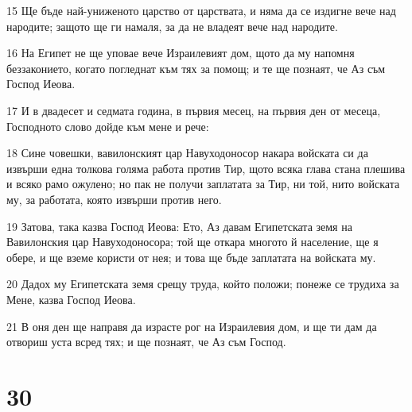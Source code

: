 \par 15 Ще бъде най-униженото царство от царствата, и няма да се издигне вече над народите; защото ще ги намаля, за да не владеят вече над народите.
\par 16 На Египет не ще уповае вече Израилевият дом, щото да му напомня беззаконието, когато погледнат към тях за помощ; и те ще познаят, че Аз съм Господ Иеова.
\par 17 И в двадесет и седмата година, в първия месец, на първия ден от месеца, Господното слово дойде към мене и рече:
\par 18 Сине човешки, вавилонският цар Навуходоносор накара войската си да извърши една толкова голяма работа против Тир, щото всяка глава стана плешива и всяко рамо ожулено; но пак не получи заплатата за Тир, ни той, нито войската му, за работата, която извърши против него.
\par 19 Затова, така казва Господ Иеова: Ето, Аз давам Египетската земя на Вавилонския цар Навуходоносора; той ще откара многото й население, ще я обере, и ще вземе користи от нея; и това ще бъде заплатата на войската му.
\par 20 Дадох му Египетската земя срещу труда, който положи; понеже се трудиха за Мене, казва Господ Иеова.
\par 21 В оня ден ще направя да израсте рог на Израилевия дом, и ще ти дам да отвориш уста всред тях; и ще познаят, че Аз съм Господ.

\chapter{30}

